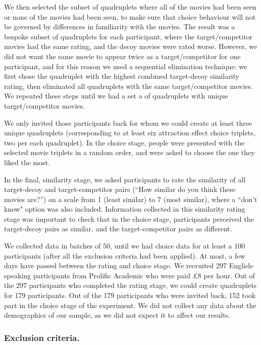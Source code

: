 \documentclass[12pt, a4paper]{article}
\begin{document}
We then selected the subset of quadruplets where all of the movies had been seen or none of the movies had been seen, to make sure that choice behaviour will not be governed by differences in familiarity with the movies. The result was a bespoke subset of quadruplets for each participant, where the target/competitor movies had the same rating, and the decoy movies were rated worse. However, we did not want the same movie to appear twice as a target/competitor for one participant, and for this reason we used a sequential elimination technique: we first chose the quadruplet with the highest combined target-decoy similarity rating, then eliminated all quadruplets with the same target/competitor movies. We repeated these steps until we had a set a of quadruplets with unique target/competitor movies.

We only invited those participants back for whom we could create at least three unique quadruplets (corresponding to at least six attraction effect choice triplets, two per each quadruplet). In the choice stage, people were presented with the selected movie triplets in a random order, and were asked to choose the one they liked the most.


In the final, similarity stage, we asked participants to rate the similarity of all target-decoy and target-competitor pairs (``How similar do you think these movies are?'') on a scale from 1 (least similar) to 7 (most similar), where a ``don't know" option was also included. Information collected in this similarity rating stage was important to check that in the choice stage, participants perceived the target-decoy pairs as similar, and the target-competitor pairs as different.

We collected data in batches of 50, until we had choice data for at least a 100 participants (after all the exclusion criteria had been applied). At most, a few days have passed between the rating and choice stage. We recruited 297 English-speaking participants from Prolific Academic who were paid £8 per hour. Out of the 297 participants who completed the rating stage, we could create quadruplets for 179 participants. Out of the 179 participants who were invited back, 152 took part in the choice stage of the experiment. We did not collect any data about the demographics of our sample, as we did not expect it to affect our results.

\subsubsection*{Exclusion criteria.} \label{exclusion_ref}
\end{document}
